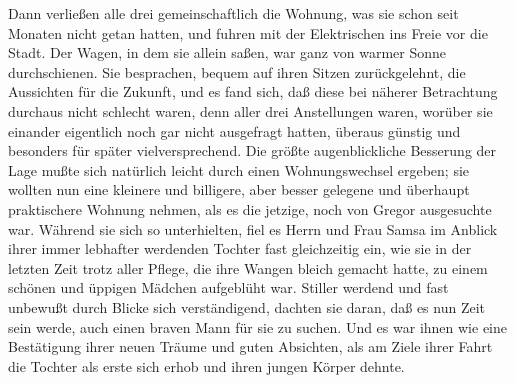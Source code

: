 Dann verließen alle drei gemeinschaftlich die Wohnung, was sie schon
seit Monaten nicht getan hatten, und fuhren mit der Elektrischen ins
Freie vor die Stadt. Der Wagen, in dem sie allein saßen, war ganz von
warmer Sonne durchschienen. Sie besprachen, bequem auf ihren Sitzen
zurückgelehnt, die Aussichten für die Zukunft, und es fand sich, daß
diese bei näherer Betrachtung durchaus nicht schlecht waren, denn aller
drei Anstellungen waren, worüber sie einander eigentlich noch gar nicht
ausgefragt hatten, überaus günstig und besonders für später
vielversprechend. Die größte augenblickliche Besserung der Lage mußte
sich natürlich leicht durch einen Wohnungswechsel ergeben; sie wollten
nun eine kleinere und billigere, aber besser gelegene und überhaupt
praktischere Wohnung nehmen, als es die jetzige, noch von Gregor
ausgesuchte war. Während sie sich so unterhielten, fiel es Herrn und
Frau Samsa im Anblick ihrer immer lebhafter werdenden Tochter fast
gleichzeitig ein, wie sie in der letzten Zeit trotz aller Pflege, die
ihre Wangen bleich gemacht hatte, zu einem schönen und üppigen Mädchen
aufgeblüht war. Stiller werdend und fast unbewußt durch Blicke sich
verständigend, dachten sie daran, daß es nun Zeit sein werde, auch einen
braven Mann für sie zu suchen. Und es war ihnen wie eine Bestätigung
ihrer neuen Träume und guten Absichten, als am Ziele ihrer Fahrt die
Tochter als erste sich erhob und ihren jungen Körper dehnte.